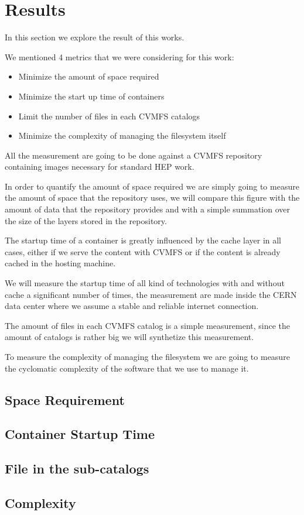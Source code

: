 \chapter{Results}\label{ch:Results}


In this section we explore the result of this works.

We mentioned 4 metrics that we were considering for this work:

\begin{itemize}
\item Minimize the amount of space required
\item Minimize the start up time of containers
\item Limit the number of files in each CVMFS catalogs
\item Minimize the complexity of managing the filesystem itself
\end{itemize}

All the measurement are going to be done against a CVMFS repository containing images necessary for standard HEP work.

In order to quantify the amount of space required we are simply going to measure the amount of space that the repository uses, we will compare this figure with the amount of data that the repository provides and with a simple summation over the size of the layers stored in the repository.

The startup time of a container is greatly influenced by the cache layer in all cases, either if we serve the content with CVMFS or if the content is already cached in the hosting machine.

We will measure the startup time of all kind of technologies with and without cache a significant number of times, the measurement are made inside the CERN data center where we assume a stable and reliable internet connection.

The amount of files in each CVMFS catalog is a simple measurement, since the amount of catalogs is rather big we will synthetize this measurement.

To measure the complexity of managing the filesystem we are going to measure the cyclomatic complexity of the software that we use to manage it.

\section{Space Requirement}
\section{Container Startup Time}
\section{File in the sub-catalogs}
\section{Complexity}
